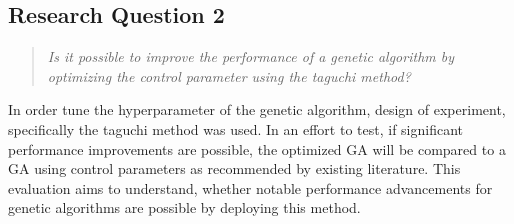 \subsection{Research Question 2}
\begin{quote}
	\begin{em}
		\textit{Is it possible to improve the performance of a genetic algorithm by optimizing the control parameter using the taguchi method?}
	\end{em}
\end{quote}

In order tune the hyperparameter of the genetic algorithm, design of experiment, specifically the taguchi method was used. In an effort to test, if significant performance improvements are possible, the optimized GA will be compared to a GA using control parameters as recommended by existing literature. This evaluation aims to understand, whether notable performance advancements for genetic algorithms are possible by deploying this method.























